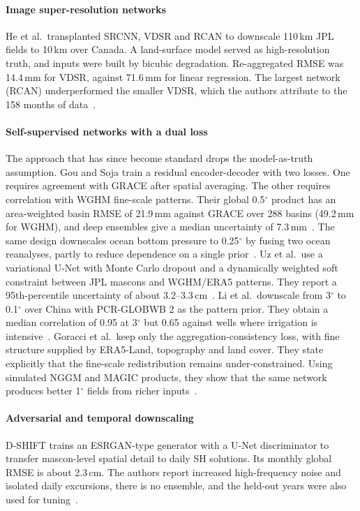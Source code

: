 \paragraph{Image super-resolution networks} He et al.\ transplanted SRCNN, VDSR and RCAN to downscale 110\,km JPL fields to 10\,km over Canada. A land-surface model served as high-resolution truth, and inputs were built by bicubic degradation. Re-aggregated RMSE was 14.4\,mm for VDSR, against 71.6\,mm for linear regression. The largest network (RCAN) underperformed the smaller VDSR, which the authors attribute to the 158 months of data~\cite{he2021deep}.

\paragraph{Self-supervised networks with a dual loss} The approach that has since become standard drops the model-as-truth assumption. Gou and Soja train a residual encoder-decoder with two losses. One requires agreement with GRACE after spatial averaging. The other requires correlation with WGHM fine-scale patterns. Their global 0.5$^\circ$ product has an area-weighted basin RMSE of 21.9\,mm against GRACE over 288 basins (49.2\,mm for WGHM), and deep ensembles give a median uncertainty of 7.3\,mm~\cite{gou2024global}. The same design downscales ocean bottom pressure to 0.25$^\circ$ by fusing two ocean reanalyses, partly to reduce dependence on a single prior~\cite{gou2025obp}. Uz et al.\ use a variational U-Net with Monte Carlo dropout and a dynamically weighted soft constraint between JPL mascons and WGHM/ERA5 patterns. They report a 95th-percentile uncertainty of about 3.2--3.3\,cm~\cite{uz2026dynamic}. Li et al.\ downscale from 3$^\circ$ to 0.1$^\circ$ over China with PCR-GLOBWB 2 as the pattern prior. They obtain a median correlation of 0.95 at 3$^\circ$ but 0.65 against wells where irrigation is intensive~\cite{li2026physically}. Goracci et al.\ keep only the aggregation-consistency loss, with fine structure supplied by ERA5-Land, topography and land cover. They state explicitly that the fine-scale redistribution remains under-constrained. Using simulated NGGM and MAGIC products, they show that the same network produces better 1$^\circ$ fields from richer inputs~\cite{goracci2026nggm}.

\paragraph{Adversarial and temporal downscaling} D-SHIFT trains an ESRGAN-type generator with a U-Net discriminator to transfer mascon-level spatial detail to daily SH solutions. Its monthly global RMSE is about 2.3\,cm. The authors report increased high-frequency noise and isolated daily excursions, there is no ensemble, and the held-out years were also used for tuning~\cite{dombos2026dshift}.

